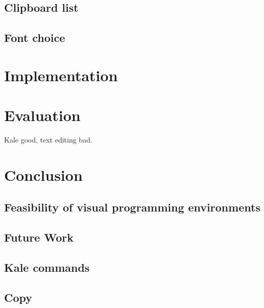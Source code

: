 \documentclass[11pt]{report}
\begin{document}
\section{Clipboard list}

\section{Font choice}

\chapter{Implementation}

\chapter{Evaluation}

Kale good, text editing bad.

\chapter{Conclusion}

\section{Feasibility of visual programming environments}

\section{Future Work}

\endgroup %
\clearpage
\renewcommand*{\bibfont}{\raggedright} %


\begin{appendices}
\chapter{Kale commands}

\section{Copy}


\end{appendices}
\end{document}
